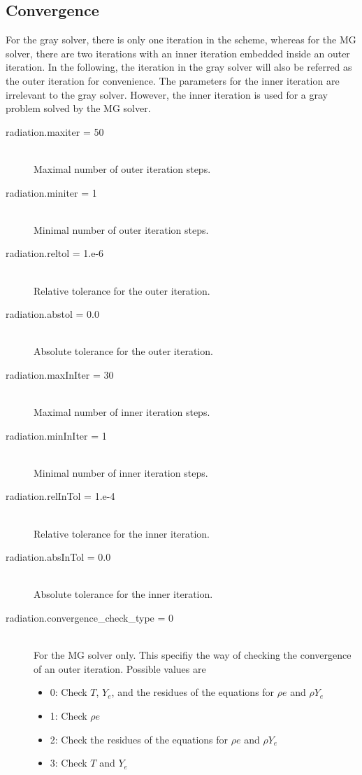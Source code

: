 \documentclass[11pt,letterpaper]{article}
\begin{document}
\subsection{Convergence}

For the gray solver, there is only one iteration in the scheme,
whereas for the MG solver, there are two iterations with an inner
iteration embedded inside an outer iteration.  In the following, the
iteration in the gray solver will also be referred as the outer
iteration for convenience.  The parameters for the inner iteration are
irrelevant to the gray solver.  However, the inner iteration is used
for a gray problem solved by the MG solver.  

\begin{description}
\item[radiation.maxiter = 50] \hfill \\
  Maximal number of outer iteration steps. 
\item[radiation.miniter = 1] \hfill \\
  Minimal number of outer iteration steps. 
\item[radiation.reltol = 1.e-6] \hfill \\
  Relative tolerance for the outer iteration.
\item[radiation.abstol = 0.0] \hfill \\
  Absolute tolerance for the outer iteration.
\item[radiation.maxInIter = 30] \hfill \\
  Maximal number of inner iteration steps. 
\item[radiation.minInIter = 1] \hfill \\
  Minimal number of inner iteration steps. 
\item[radiation.relInTol = 1.e-4] \hfill \\
  Relative tolerance for the inner iteration.
\item[radiation.absInTol = 0.0] \hfill \\
  Absolute tolerance for the inner iteration.  
\item[radiation.convergence\_check\_type = 0] \hfill \\
  For the MG solver only.  This specifiy the way of checking the
  convergence of an outer iteration.  Possible values are
  \begin{itemize}
    \item 0: Check $T$, $Y_e$, and the residues of the equations for
      $\rho e$ and $\rho Y_e$
    \item 1: Check $\rho e$
    \item 2: Check the residues of the equations for $\rho e$ and $\rho Y_e$
    \item 3: Check $T$ and $Y_e$
  \end{itemize}
\end{description}
\end{document}
